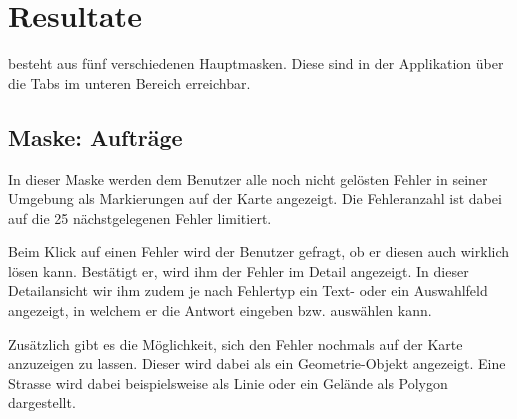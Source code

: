 \section{Resultate}

\kort{} besteht aus fünf verschiedenen Hauptmasken.
Diese sind in der Applikation über die Tabs im unteren Bereich erreichbar.

\subsection{Maske: Aufträge}
In dieser Maske werden dem Benutzer alle noch nicht gelösten Fehler in seiner Umgebung als Markierungen auf der Karte angezeigt.
Die Fehleranzahl ist dabei auf die 25 nächstgelegenen Fehler limitiert.

Beim Klick auf einen Fehler wird der Benutzer gefragt, ob er diesen auch wirklich lösen kann.
Bestätigt er, wird ihm der Fehler im Detail angezeigt.
In dieser Detailansicht wir ihm zudem je nach Fehlertyp ein Text- oder ein Auswahlfeld angezeigt, in welchem er die Antwort eingeben bzw. auswählen kann. 

Zusätzlich gibt es die Möglichkeit, sich den Fehler nochmals auf der Karte anzuzeigen zu lassen.
Dieser wird dabei als ein Geometrie-Objekt angezeigt.
Eine Strasse wird dabei beispielsweise als Linie oder ein Gelände als Polygon dargestellt.

